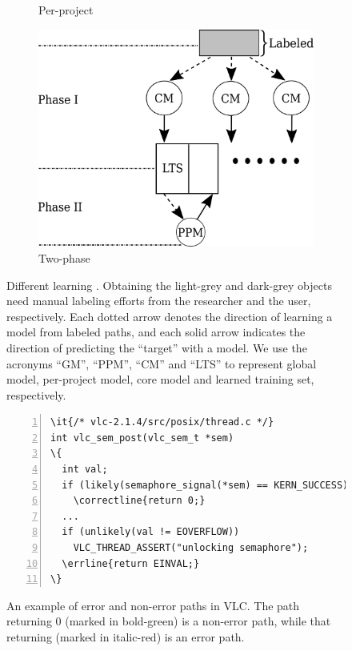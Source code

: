 \documentclass[12pt]{report}	%
\begin{document}
\begin{figure}[t]
\begin{subfigure}[b]{0.3\textwidth}
    \caption{Per-project \paradigm}
    \label{fig:mmodels:pproject}
\end{subfigure}%
\hfill
\begin{subfigure}[b]{0.4\textwidth}
	\centering
    \includegraphics[width=.9\linewidth]{images/two-phase.pdf}
    \caption{Two-phase \paradigm}
    \label{fig:mmodels:tphase}
\end{subfigure}
\caption[Different learning ]{Different learning . 
Obtaining the light-grey and dark-grey objects 
need manual labeling efforts from the researcher and the user, respectively.
Each dotted arrow denotes the direction of learning a model from labeled paths,
and each solid arrow indicates the direction of predicting the ``target'' with a model.
We use the acronyms ``GM'', ``PPM'', ``CM'' and ``LTS'' to represent
global model, per-project model, core model and learned training set, respectively.
}
\label{fig:mmodels}
\end{figure}

\begin{figure}[t]
\begin{Verbatim}[numbers=left,xleftmargin=6mm,fontsize=\footnotesize,
    commandchars=\\\{\}]
\it{/* vlc-2.1.4/src/posix/thread.c */}
int vlc_sem_post(vlc_sem_t *sem)
\{
  int val;
  if (likely(semaphore_signal(*sem) == KERN_SUCCESS))
    \correctline{return 0;}
  ...
  if (unlikely(val != EOVERFLOW))
    VLC_THREAD_ASSERT("unlocking semaphore");
  \errline{return EINVAL;}
\}
\end{Verbatim}
\caption[An example of error and non-error paths in VLC]{An example of error and non-error paths in VLC.
The path returning 0 (marked in bold-green) is a non-error path, 
while that returning  (marked in italic-red) is an error path.
}
\label{fig:unifeature-exam}
\end{figure}
\end{document}
